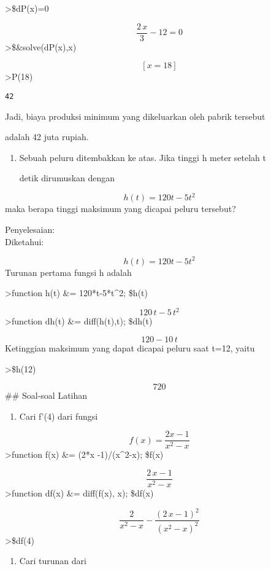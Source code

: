 \documentclass[
]{book}
\providecommand{\tightlist}{%
  \setlength{\itemsep}{0pt}\setlength{\parskip}{0pt}}
\begin{document}
\textgreater\$dP(x)=0

\[\frac{2\,x}{3}-12=0\]\textgreater\$\&solve(dP(x),x)

\[\left[ x=18 \right] \]\textgreater P(18)

\begin{verbatim}
42
\end{verbatim}

Jadi, biaya produksi minimum yang dikeluarkan oleh pabrik tersebut

adalah 42 juta rupiah.

\begin{enumerate}
\def\labelenumi{\arabic{enumi}.}
\setcounter{enumi}{2}
\item
  Sebuah peluru ditembakkan ke atas. Jika tinggi h meter setelah t

  detik dirumuskan dengan
\end{enumerate}

\[h(t)=120t-5t^2\] maka berapa tinggi maksimum yang dicapai peluru tersebut?

Penyelesaian:\\
Diketahui:

\[h(t)=120t-5t^2\] Turunan pertama fungsi h adalah

\textgreater function h(t) \&= 120*t-5*t\^{}2; \$h(t)

\[120\,t-5\,t^2\]\textgreater function dh(t) \&= diff(h(t),t); \$dh(t)

\[120-10\,t\] Ketinggian maksimum yang dapat dicapai peluru saat t=12, yaitu

\textgreater\$h(12)

\[720\]\#\# Soal-soal Latihan

\begin{enumerate}
\def\labelenumi{\arabic{enumi}.}
\tightlist
\item
  Cari f'(4) dari fungsi
\end{enumerate}

\[f(x) = \frac {2x-1}{x^2-x}\]\textgreater function f(x) \&= (2*x -1)/(x\^{}2-x); \$f(x)

\[\frac{2\,x-1}{x^2-x}\]\textgreater function df(x) \&= diff(f(x), x); \$df(x)

\[\frac{2}{x^2-x}-\frac{\left(2\,x-1\right)^2}{\left(x^2-x\right)^2}\]\textgreater\$df(4)

\begin{enumerate}
\def\labelenumi{\arabic{enumi}.}
\setcounter{enumi}{1}
\tightlist
\item
  Cari turunan dari
\end{enumerate}
\end{document}
